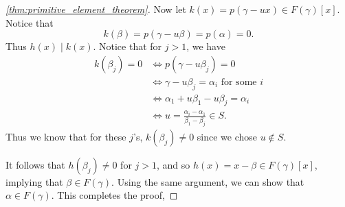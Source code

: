 \documentclass[notoc,notitlepage]{tufte-book}
\begin{document}
\begin{proof}[\cref{thm:primitive_element_theorem}]
  Now let $k(x) = p(\gamma - ux) \in F(\gamma)[x]$. Notice that
  \begin{equation*}
    k(\beta) = p(\gamma - u \beta) = p(\alpha) = 0.
  \end{equation*}
  Thus $h(x) \mid k(x)$. Notice that for $j > 1$, we have
  \begin{align*}
    k(\beta_j) = 0 &\iff p(\gamma - u \beta_j) = 0 \\
                   &\iff \gamma - u \beta_j = \alpha_i \text{ for some } i \\
                   &\iff \alpha_1 + u \beta_1 - u \beta_j = \alpha_i \\
                   &\iff u = \frac{\alpha_i - \alpha_1}{\beta_1 - \beta_j} \in
                   S.
  \end{align*}
  Thus we know that for these $j$'s, $k(\beta_j) \neq 0$ since we chose $u
  \notin S$.
  
  It follows that $h(\beta_j) \neq 0$ for $j > 1$, and so $h(x) = x - \beta \in
  F(\gamma)[x]$, implying that $\beta \in F(\gamma)$. Using the same argument,
  we can show that $\alpha \in F(\gamma)$. This completes the proof,
\end{proof}
\end{document}
